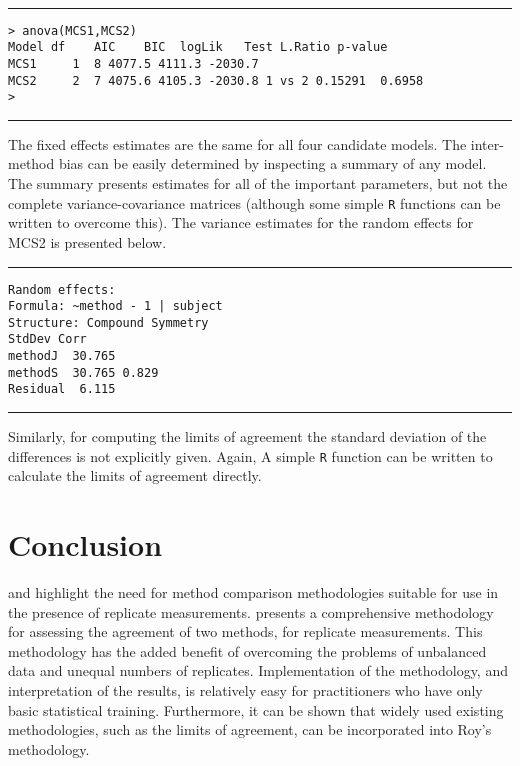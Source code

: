 \documentclass[12pt, a4paper]{report}
\theoremstyle{plain}
\theoremstyle{definition}
\theoremstyle{remark}
\begin{document}
\\
\hrule
\begin{verbatim}
> anova(MCS1,MCS2)
Model df    AIC    BIC  logLik   Test L.Ratio p-value
MCS1     1  8 4077.5 4111.3 -2030.7
MCS2     2  7 4075.6 4105.3 -2030.8 1 vs 2 0.15291  0.6958
>
\end{verbatim}
\hrule
\vspace{1cm}
The fixed effects estimates are the same for all four candidate models. The inter-method bias can be easily determined by inspecting a summary of any model. The summary presents estimates for all of the important parameters, but not the complete variance-covariance matrices (although some simple \texttt{R} functions can be written to overcome this). The variance estimates for the random effects for MCS2 is presented below.
\\
\hrule
\begin{verbatim}
Random effects:
Formula: ~method - 1 | subject
Structure: Compound Symmetry
StdDev Corr
methodJ  30.765
methodS  30.765 0.829
Residual  6.115
\end{verbatim}
\hrule
\vspace{1cm}
Similarly, for computing the limits of agreement the standard deviation of the differences is not explicitly given. Again, A simple \texttt{R} function can be written to calculate the limits of agreement directly.









\newpage
\section{Conclusion}
\citet{BXC2008} and \citet{roy} highlight the need for method comparison methodologies suitable for use in the presence of replicate measurements. \citet{roy} presents a comprehensive methodology for assessing the agreement of two methods, for replicate measurements. This methodology has the added benefit of overcoming the problems of unbalanced data and unequal numbers of replicates. Implementation of the methodology, and interpretation of the results, is relatively easy for practitioners who have only basic statistical training. Furthermore, it can be shown that widely used existing methodologies, such as the limits of agreement, can be incorporated into Roy's methodology.
\end{document}
